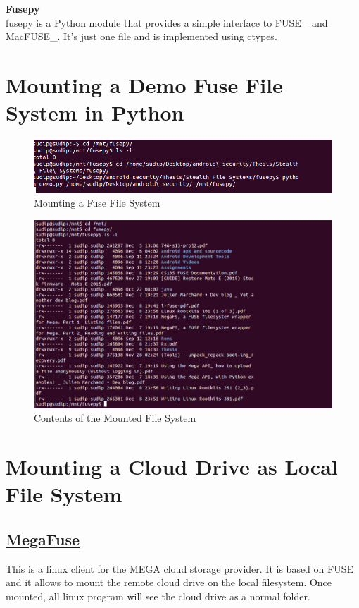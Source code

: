 \textbf{Fusepy}\\
fusepy is a Python module that provides a simple interface to FUSE\_ and
MacFUSE\_. It's just one file and is implemented using ctypes.
\section{Mounting a Demo Fuse File System in Python}
\begin{figure}[h]
   \centering
   \includegraphics[width=15cm]{fig05/fusepy}
   \caption{Mounting a Fuse File System}
   
  \end{figure}
  \begin{figure}[h]
     \centering
     \includegraphics[width=15cm]{fig05/mnt}
     \caption{Contents of the Mounted File System}
     
    \end{figure}
    
    
\vspace{2cm}    
\section{Mounting a Cloud Drive as Local File System}



\subsection{\href{https://github.com/matteoserva/MegaFuse}{MegaFuse}}
This is a linux client for the MEGA cloud storage provider. It is based on FUSE and it allows to mount the remote cloud drive on the local filesystem. Once mounted, all linux program will see the cloud drive as a normal folder.\\

